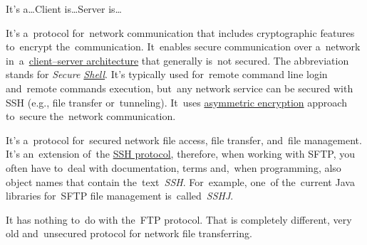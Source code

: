 \label{clientserverarchitecture}
\newline\todo It's a\dots Client is\dots Server is\dots

\label{tcpip}


\label{tcp}

\label{ip}

\label{http}

\label{smtp}

\label{ssh}
It's a~protocol for~network communication that includes cryptographic features to~encrypt the~communication. It~enables secure communication over a~network in~a~\hyperref[clientserverarchitecture]{client--server architecture} that generally is~not secured. The abbreviation stands for \textit{Secure \hyperref[shellcligui]{Shell}}. It's typically used for~remote command line login and~remote commands execution, but~any network service can be secured with SSH (e.g., file transfer or~tunneling). It~uses \hyperref[asymmetricencryption]{asymmetric encryption} approach to~secure the~network communication.

\label{sftp}
It's a~protocol for~secured network file access, file transfer, and~file management. It's an~extension of~the \hyperref[ssh]{SSH protocol}, therefore, when working with SFTP, you often have to~deal with documentation, terms and,~when programming, also object names that contain the~text~\textit{SSH}. For~example, one~of the~current Java libraries for~SFTP file management is~called~\textit{SSHJ}.

\warning It has nothing to~do with the~FTP protocol. That is completely different, very old and~unsecured protocol for network file transferring.

